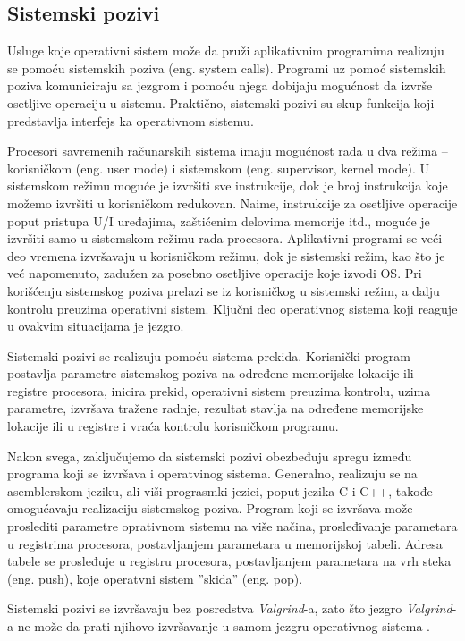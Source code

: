 \documentclass[12pt,oneside]{memoir}
\theoremstyle{plain}
\theoremstyle{definition}
\begin{document}
\subsection*{Sistemski pozivi}
Usluge koje operativni sistem može da pruži aplikativnim programima realizuju se pomoću sistemskih poziva (eng. system calls). Programi uz pomoć sistemskih poziva komuniciraju sa jezgrom i pomoću njega dobijaju mogućnost da izvrše osetljive operaciju u sistemu. Praktično, sistemski pozivi su skup funkcija koji predstavlja interfejs ka operativnom sistemu. 

Procesori savremenih računarskih sistema imaju mogućnost rada u dva režima – korisničkom (eng. user mode) i sistemskom (eng. supervisor, kernel mode). U sistemskom režimu moguće je izvršiti sve instrukcije, dok je broj instrukcija koje možemo izvršiti u korisničkom redukovan. Naime, instrukcije za osetljive operacije poput pristupa U/I uređajima, zaštićenim delovima memorije itd., moguće je izvršiti samo u sistemskom režimu rada procesora. Aplikativni programi se veći deo vremena izvršavaju u korisničkom režimu, dok je sistemski režim, kao što je već napomenuto, zadužen za posebno osetljive operacije koje izvodi OS. Pri korišćenju sistemskog poziva prelazi se iz korisničkog u sistemski režim, a dalju kontrolu preuzima operativni sistem. Ključni deo operativnog sistema koji reaguje u ovakvim situacijama je jezgro.

Sistemski pozivi se realizuju pomoću sistema prekida.  Korisnički program postavlja parametre sistemskog poziva na određene memorijske lokacije ili registre procesora, inicira prekid, operativni sistem preuzima kontrolu, uzima parametre, izvršava tražene radnje, rezultat stavlja na određene memorijske lokacije ili u registre i vraća kontrolu korisničkom programu.

Nakon svega, zaključujemo da sistemski pozivi obezbeđuju spregu između programa koji se izvršava i operatvinog sistema. Generalno, realizuju se na asemblerskom jeziku, ali viši prograsmki jezici, poput jezika C i C++, takođe omogućavaju realizaciju sistemskog poziva. Program koji se izvršava može proslediti parametre oprativnom sistemu na više načina, prosleđivanje parametara u registrima procesora, postavljanjem parametara u memorijskoj tabeli. Adresa tabele se prosleđuje u registru procesora, postavljanjem parametara na vrh steka (eng. push), koje operatvni sistem ''skida'' (eng. pop).

Sistemski pozivi se izvršavaju bez posredstva \textit{Valgrind}-a, zato što jezgro \textit{Valgrind}-a ne može da prati njihovo izvršavanje u samom jezgru operativnog sistema \cite{os}. 
\end{document}
